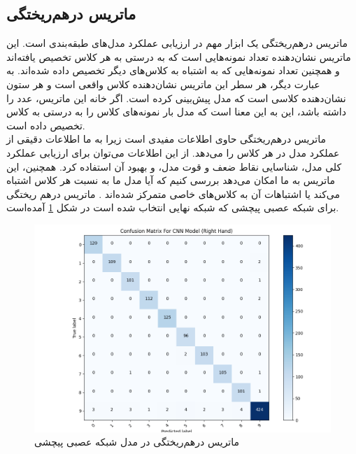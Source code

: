 \subsection[ماتریس درهم‌ریختگی]{ماتریس درهم‌ریختگی\protect{}}
ماتریس درهم‌ریختگی یک ابزار مهم در ارزیابی عملکرد مدل‌های طبقه‌بندی است. این ماتریس نشان‌دهنده تعداد نمونه‌هایی است که به درستی به هر کلاس تخصیص یافته‌اند و همچنین تعداد نمونه‌هایی که به اشتباه به کلاس‌های دیگر تخصیص داده شده‌اند. به عبارت دیگر، هر سطر این ماتریس نشان‌دهنده کلاس واقعی است و هر ستون نشان‌دهنده کلاسی است که مدل پیش‌بینی کرده است. اگر خانه  این ماتریس، عدد  را داشته باشد، این به این معنا است که مدل  بار نمونه‌های کلاس  را به درستی به کلاس  تخصیص داده است.
\\
ماتریس درهم‌ریختگی حاوی اطلاعات مفیدی است زیرا به ما اطلاعات دقیقی از عملکرد مدل در هر کلاس را می‌دهد. از این اطلاعات می‌توان برای ارزیابی عملکرد کلی مدل، شناسایی نقاط ضعف و قوت مدل، و بهبود آن استفاده کرد. همچنین، این ماتریس به ما امکان می‌دهد بررسی کنیم که آیا مدل ما به نسبت هر کلاس اشتباه می‌کند یا اشتباهات آن به کلاس‌های خاصی متمرکز شده‌اند \cite{Confusio72:online}.
ماتریس درهم ریختگی برای شبکه عصبی پیچشی که شبکه نهایی انتخاب شده  است در شکل \ref{matrix} آمده‌است.



\begin{figure}[h]
    \centering
    \includegraphics[width=1\textwidth]{Matrix_CNN_right.png}
    \caption{ ماتریس درهم‌ریختگی در مدل شبکه عصبی پیچشی}
    \label{matrix}
\end{figure}


